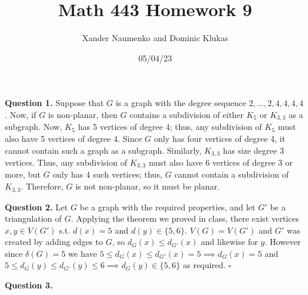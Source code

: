 \documentclass[letterpaper, reqno,11pt]{article}
\begin{document}
\title{Math 443 Homework 9}
\date{05/04/23}
\author{Xander Naumenko and Dominic Klukas}
\maketitle

{\medskip\noindent\bf Question 1.}  
Suppose that $G$ is a graph with the degree sequence $2,\ldots,2,4,4,4,4$. Now, if $G$ is non-planar, then $G$ contains a subdivision of either $K_5$ or $K_{3,3}$ as a subgraph. Now, $K_5$ has 5 vertices of degree 4; thus, any subdivision of $K_5$ must also have 5 vertices of degree 4. Since $G$ only has four vertices of degree 4, it cannot contain such a graph as a subgraph. Similarly, $K_{3,3}$ has size degree 3 vertices. Thus, any subdivision of $K_{3,3}$ must also have 6 vertices of degree 3 or more, but $G$ only has 4 such vertices; thus, $G$ cannot contain a subdivision of $K_{3,3}$. Therefore, $G$ is not non-planar, so it must be planar.

{\medskip\noindent\bf Question 2.} Let $G$ be a graph with the required properties, and let $G'$ be a triangulation of $G$. Applying the theorem we proved in class, there exist vertices $x,y\in V(G')$ s.t. $d(x)=5$ and $d(y)\in \{5,6\} $. $V(G)=V(G')$ and $G'$ was created by adding edges to $G$, so $d_G(x)\leq d_{G'}(x)$ and likewise for $y$. However since $\delta(G)=5$ we have $5\leq d_{G}(x)\leq d_{G'}(x)=5 \implies d_{G}(x)=5$ and $5\leq d_G(y)\leq d_{G'}(y)\leq 6 \implies d_{G}(y)\in \{5,6\} $ as required. $\square$

{\medskip\noindent\bf Question 3.}  
\end{document}
